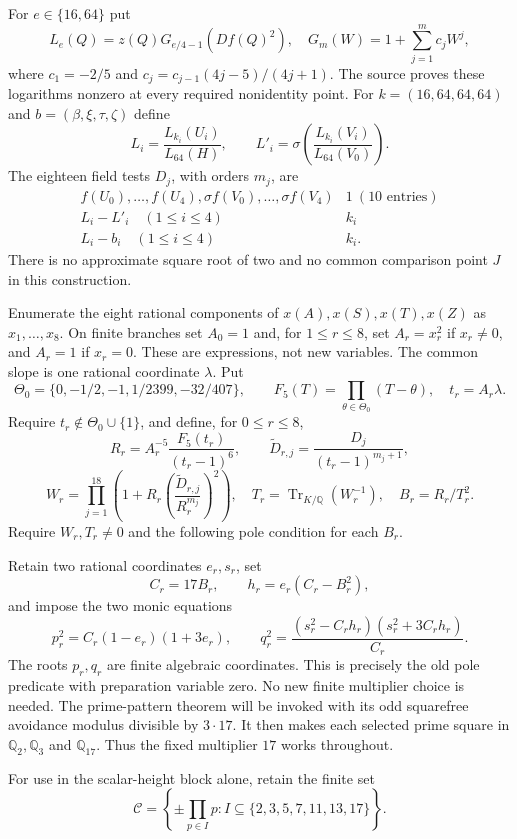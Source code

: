 For $e\in\{16,64\}$ put
\[
 L_e(Q)=z(Q)G_{e/4-1}(Df(Q)^2),\quad
 G_m(W)=1+\sum_{j=1}^m c_jW^j,
\]
where $c_1=-2/5$ and $c_j=c_{j-1}(4j-5)/(4j+1)$.
The source proves these logarithms nonzero at every required nonidentity
point. For $k=(16,64,64,64)$ and $b=(\beta,\xi,\tau,\zeta)$ define
\[
 L_i=\frac{L_{k_i}(U_i)}{L_{64}(H)},\qquad
 L'_i=\sigma\!\left(\frac{L_{k_i}(V_i)}{L_{64}(V_0)}\right).
\]
The eighteen field tests $D_j$, with orders $m_j$, are
\[
 \begin{array}{c|c}
 f(U_0),\ldots,f(U_4),\sigma f(V_0),\ldots,\sigma f(V_4)&1\ (10\text{ entries})\\
 L_i-L'_i\quad(1\le i\le4)& k_i\\
 L_i-b_i\quad(1\le i\le4)&k_i.
 \end{array}
\]
There is no approximate square root of two and no common comparison
point $J$ in this construction.

Enumerate the eight rational components of $x(A),x(S),x(T),x(Z)$ as
$x_1,\ldots,x_8$. On finite branches set $A_0=1$ and, for $1\le r\le8$,
set $A_r=x_r^2$ if $x_r\ne0$, and $A_r=1$ if $x_r=0$. These are
expressions, not new variables. The common slope is one rational
coordinate $\lambda$. Put
\[
 \Theta_0=\{0,-1/2,-1,1/2399,-32/407\},\qquad
 F_5(T)=\prod_{\theta\in\Theta_0}(T-\theta),\quad t_r=A_r\lambda.
\]
Require $t_r\notin\Theta_0\cup\{1\}$, and define, for $0\le r\le8$,
\[
 R_r=A_r^{-5}\frac{F_5(t_r)}{(t_r-1)^6},\qquad
 \widetilde D_{r,j}=\frac{D_j}{(t_r-1)^{m_j+1}},
\]
\[
 W_r=\prod_{j=1}^{18}\left(1+R_r
       \left(\frac{\widetilde D_{r,j}}{R_r^{m_j}}\right)^2\right),
 \quad T_r=\operatorname{Tr}_{K/\mathbb Q}(W_r^{-1}),
 \quad B_r=R_r/T_r^2.
\]
Require $W_r,T_r\ne0$ and the following pole condition for each $B_r$.

Retain two rational coordinates $e_r,s_r$, set
\[
 C_r=17B_r,\qquad h_r=e_r(C_r-B_r^2),
\]
and impose the two monic equations
\[
 p_r^2=C_r(1-e_r)(1+3e_r),\qquad
 q_r^2=\frac{(s_r^2-C_rh_r)(s_r^2+3C_rh_r)}{C_r}.
\]
The roots $p_r,q_r$ are finite algebraic coordinates. This is precisely
the old pole predicate with preparation variable zero. No new finite
multiplier choice is needed. The prime-pattern theorem will be invoked
with its odd squarefree avoidance modulus divisible by $3\cdot17$.
It then makes each selected prime square in $\mathbb Q_2,\mathbb Q_3$
and $\mathbb Q_{17}$. Thus the fixed multiplier $17$ works throughout.

For use in the scalar-height block alone, retain the finite set
\[
 \mathcal C=\left\{\pm\prod_{p\in I}p:
 I\subseteq\{2,3,5,7,11,13,17\}\right\}.
\]


